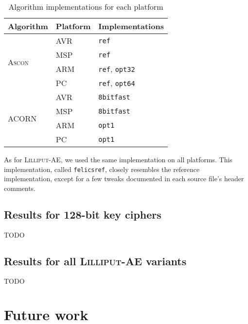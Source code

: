 \documentclass{article}
\begin{document}
\begin{table}[H]
  \centering
  \begin{tabular}{l|l|l}
    \textbf{Algorithm} & \textbf{Platform} & \textbf{Implementations}     \\
    \hline
    \multirow{4}{*}{\textsc{Ascon}}
                       & AVR               & \texttt{ref}                 \\
                       & MSP               & \texttt{ref}                 \\
                       & ARM               & \texttt{ref}, \texttt{opt32} \\
                       & PC                & \texttt{ref}, \texttt{opt64} \\
    \hline
    \multirow{4}{*}{\textsc{ACORN}}
                       & AVR               & \texttt{8bitfast}            \\
                       & MSP               & \texttt{8bitfast}            \\
                       & ARM               & \texttt{opt1}                \\
                       & PC                & \texttt{opt1}                \\
    \hline
  \end{tabular}
  \caption{Algorithm implementations for each platform}
  \label{table:results/implems}
\end{table}

As for \textsc{Lilliput-AE}, we used the same implementation on all
platforms.  This implementation, called \texttt{felicsref}, closely
resembles the reference implementation, except for a few tweaks
documented in each source file's header comments.

\subsection{Results for 128-bit key ciphers}
\label{sec:results/128}

TODO

\subsection{Results for all \textsc{Lilliput-AE} variants}
\label{sec:results/lilliputae}

TODO

\section{Future work}
\label{sec:future}
\end{document}
